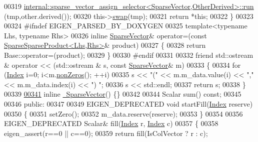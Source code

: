 \begin{DoxyCode}
00319       \hyperlink{struct_eigen_1_1internal_1_1sparse__vector__assign__selector}{internal::sparse\_vector\_assign\_selector<SparseVector,OtherDerived>::run}
      (tmp,other.derived());
00320       this->\hyperlink{endian_8c_a3ca5ecd34b04d6a243c054ac3a57f68d}{swap}(tmp);
00321       \textcolor{keywordflow}{return} *\textcolor{keyword}{this};
00322     \}
00323 
00324 \textcolor{preprocessor}{    #ifndef EIGEN\_PARSED\_BY\_DOXYGEN}
00325     \textcolor{keyword}{template}<\textcolor{keyword}{typename} Lhs, \textcolor{keyword}{typename} Rhs>
00326     \textcolor{keyword}{inline} \hyperlink{group___sparse_core___module_class_eigen_1_1_sparse_vector}{SparseVector}& operator=(\textcolor{keyword}{const} 
      \hyperlink{class_eigen_1_1_sparse_sparse_product}{SparseSparseProduct<Lhs,Rhs>}& product)
00327     \{
00328       \textcolor{keywordflow}{return} Base::operator=(product);
00329     \}
00330 \textcolor{preprocessor}{    #endif}
00331 
00332     \textcolor{keyword}{friend} std::ostream & operator << (std::ostream & s, \textcolor{keyword}{const} \hyperlink{group___sparse_core___module_class_eigen_1_1_sparse_vector}{SparseVector}& m)
00333     \{
00334       \textcolor{keywordflow}{for} (\hyperlink{group___core___module_a554f30542cc2316add4b1ea0a492ff02}{Index} i=0; i<m.\hyperlink{group___sparse_core___module_aeaa74603bb1405f622726907795c9b5a}{nonZeros}(); ++i)
00335         s << \textcolor{stringliteral}{"("} << m.m\_data.value(i) << \textcolor{stringliteral}{","} << m.m\_data.index(i) << \textcolor{stringliteral}{") "};
00336       s << std::endl;
00337       \textcolor{keywordflow}{return} s;
00338     \}
00339 
\hyperlink{group___sparse_core___module_ad519592c203aedf33c524feb1bdaad1b}{00341}     \textcolor{keyword}{inline} \hyperlink{group___sparse_core___module_ad519592c203aedf33c524feb1bdaad1b}{~SparseVector}() \{\}
00342 
00344     Scalar sum() \textcolor{keyword}{const};
00345 
00346   \textcolor{keyword}{public}:
00347 
00349     EIGEN\_DEPRECATED \textcolor{keywordtype}{void} startFill(\hyperlink{group___core___module_a554f30542cc2316add4b1ea0a492ff02}{Index} reserve)
00350     \{
00351       setZero();
00352       m\_data.reserve(reserve);
00353     \}
00354 
00356     EIGEN\_DEPRECATED Scalar& fill(\hyperlink{group___core___module_a554f30542cc2316add4b1ea0a492ff02}{Index} r, \hyperlink{group___core___module_a554f30542cc2316add4b1ea0a492ff02}{Index} c)
00357     \{
00358       eigen\_assert(r==0 || c==0);
00359       \textcolor{keywordflow}{return} fill(IsColVector ? r : c);

\end{DoxyCode}
